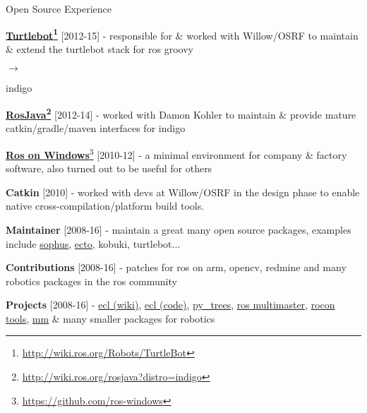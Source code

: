 \documentclass[a4paper,10pt]{article}
\begin{document}
\begin{cvsection}{Open Source Experience}
 \raggedright
  \begin{djs_itemize}
    \item \textbf{\href{http://wiki.ros.org/Robots/TurtleBot}{Turtlebot}\footnote{\href{http://wiki.ros.org/Robots/TurtleBot}{http://wiki.ros.org/Robots/TurtleBot}}} [2012-15] - responsible for \& worked with Willow/OSRF to maintain \& extend the turtlebot stack for ros groovy \begin{small}$\rightarrow$\end{small} indigo
    \item \textbf{\href{http://wiki.ros.org/rosjava?distro=indigo}{RosJava}\footnote{\href{http://wiki.ros.org/rosjava?distro=indigo}{http://wiki.ros.org/rosjava?distro=indigo}}} [2012-14] - worked with Damon Kohler to maintain \& provide mature catkin/gradle/maven interfaces for indigo
    \item \textbf{\href{https://github.com/ros-windows}{Ros on Windows}}\footnote{\href{https://github.com/ros-windows}{https://github.com/ros-windows}} [2010-12] - a minimal environment for company \& factory software, also turned out to be useful for others
    \item \textbf{Catkin} [2010] - worked with devs at Willow/OSRF in the design phase to enable native cross-compilation/platform build tools.
    \item \textbf{Maintainer} [2008-16] - maintain a great many open source packages, examples include \href{https://github.com/stonier/sophus}{sophus}, \href{https://github.com/plasmodic/ecto}{ecto}, kobuki, turtlebot...
    \item \textbf{Contributions} [2008-16] - patches for ros on arm, opencv, redmine and many robotics packages in the ros community
    \item \textbf{Projects} [2008-16] - \href{http://wiki.ros.org/ecl}{ecl (wiki)}, \href{https://github.com/stonier/ecl_core}{ecl (code)}, \href{https://github.com/stonier/py_trees_suite}{py\_trees}, \href{https://github.com/robotics-in-concert/rocon_multimaster}{ros multimaster}, \href{https://github.com/robotics-in-concert/rocon_tools}{rocon tools}, \href{https://github.com/stonier/message_multiplexing}{mm} \& many smaller packages for robotics
  \end{djs_itemize}
\end{cvsection}
\end{document}
